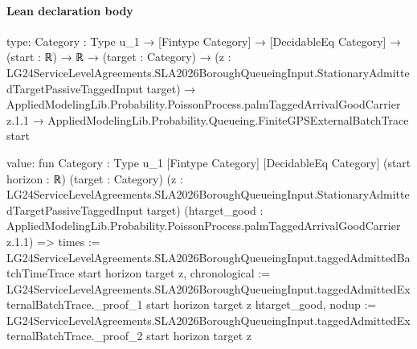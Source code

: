 \documentclass[10pt]{article}
\begin{document}
\paragraph{Lean declaration body}
\begin{ReviewVerbatim}
type:
{Category : Type u_1} →
  [Fintype Category] →
    [DecidableEq Category] →
      (start : ℝ) →
        ℝ →
          (target : Category) →
            (z :
                LG24ServiceLevelAgreements.SLA2026BoroughQueueingInput.StationaryAdmittedTargetPassiveTaggedInput
                  target) →
              AppliedModelingLib.Probability.PoissonProcess.palmTaggedArrivalGoodCarrier z.1.1 →
                AppliedModelingLib.Probability.Queueing.FiniteGPSExternalBatchTrace start

value:
fun {Category : Type u_1} [Fintype Category] [DecidableEq Category] (start horizon : ℝ) (target : Category)
    (z : LG24ServiceLevelAgreements.SLA2026BoroughQueueingInput.StationaryAdmittedTargetPassiveTaggedInput target)
    (htarget_good : AppliedModelingLib.Probability.PoissonProcess.palmTaggedArrivalGoodCarrier z.1.1) =>
  { times := LG24ServiceLevelAgreements.SLA2026BoroughQueueingInput.taggedAdmittedBatchTimeTrace start horizon target z,
    chronological :=
      LG24ServiceLevelAgreements.SLA2026BoroughQueueingInput.taggedAdmittedExternalBatchTrace._proof_1 start horizon
        target z htarget_good,
    nodup :=
      LG24ServiceLevelAgreements.SLA2026BoroughQueueingInput.taggedAdmittedExternalBatchTrace._proof_2 start horizon
        target z }
\end{ReviewVerbatim}
\end{document}
